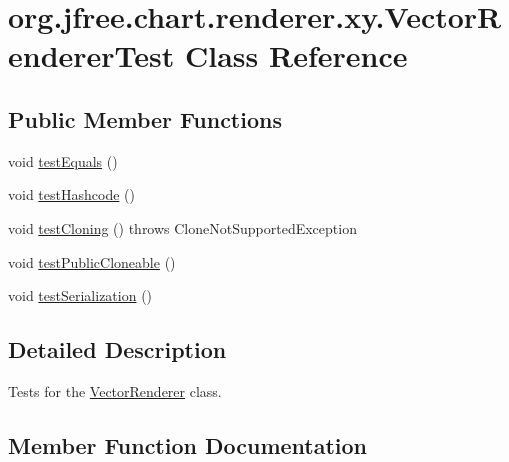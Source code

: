 \hypertarget{classorg_1_1jfree_1_1chart_1_1renderer_1_1xy_1_1_vector_renderer_test}{}\section{org.\+jfree.\+chart.\+renderer.\+xy.\+Vector\+Renderer\+Test Class Reference}
\label{classorg_1_1jfree_1_1chart_1_1renderer_1_1xy_1_1_vector_renderer_test}
\subsection*{Public Member Functions}
\begin{DoxyCompactItemize}
\item 
void \mbox{\hyperlink{classorg_1_1jfree_1_1chart_1_1renderer_1_1xy_1_1_vector_renderer_test_ae1351950b7799d97f122c327f8da0e05}{test\+Equals}} ()
\item 
void \mbox{\hyperlink{classorg_1_1jfree_1_1chart_1_1renderer_1_1xy_1_1_vector_renderer_test_ac9d14f6a07bfc26f52f4d9efd6499dba}{test\+Hashcode}} ()
\item 
void \mbox{\hyperlink{classorg_1_1jfree_1_1chart_1_1renderer_1_1xy_1_1_vector_renderer_test_a5f32ee1a1acc8f49f21ca863650ca89e}{test\+Cloning}} ()  throws Clone\+Not\+Supported\+Exception 
\item 
void \mbox{\hyperlink{classorg_1_1jfree_1_1chart_1_1renderer_1_1xy_1_1_vector_renderer_test_ae75d47a1b50e173f2213a7c855450822}{test\+Public\+Cloneable}} ()
\item 
void \mbox{\hyperlink{classorg_1_1jfree_1_1chart_1_1renderer_1_1xy_1_1_vector_renderer_test_aac163180045503a538f6019ac36ec0fd}{test\+Serialization}} ()
\end{DoxyCompactItemize}


\subsection{Detailed Description}
Tests for the \mbox{\hyperlink{classorg_1_1jfree_1_1chart_1_1renderer_1_1xy_1_1_vector_renderer}{Vector\+Renderer}} class. 

\subsection{Member Function Documentation}
\mbox{\label{classorg_1_1jfree_1_1chart_1_1renderer_1_1xy_1_1_vector_renderer_test_a5f32ee1a1acc8f49f21ca863650ca89e}} 
